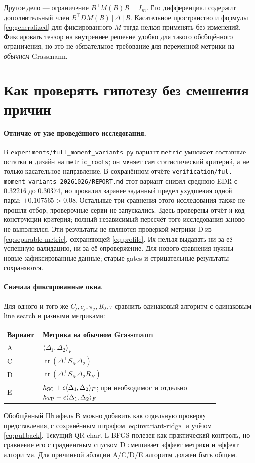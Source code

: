\documentclass[11pt,a4paper]{article}
\newcommand{\tr}{\operatorname{tr}}
\newcommand{\inner}[2]{\langle#1,#2\rangle_F}
\newcommand{\code}[1]{\nolinkurl{#1}}
\theoremstyle{remark}
\begin{document}
Другое дело --- ограничение $B^\top M(B)B=I_m$. Его дифференциал содержит
дополнительный член $B^\top DM(B)[\Delta]B$. Касательное пространство
и формулы \eqref{eq:generalized} для фиксированного $M$ тогда нельзя
применять без изменений. Фиксировать тензор на внутреннее решение удобно
для такого обобщённого ограничения, но это не обязательное требование
для переменной метрики на \emph{обычном} Grassmann.

\section{Как проверять гипотезу без смешения причин}

\paragraph{Отличие от уже проведённого исследования.}
В \code{experiments/full_moment_variants.py} вариант \code{metric}
умножает составные остатки и дизайн на \code{metric_roots}; он меняет
сам статистический критерий, а не только касательное направление.
В сохранённом отчёте
\code{verification/full-moment-variants-20261026/REPORT.md}
этот вариант снизил среднюю EDR с $0.32216$ до $0.30374$, но провалил
заранее заданный предел ухудшения одной пары: $+0.107565>0.08$.
Остальные три сравнения этого исследования также не прошли отбор,
проверочные серии не запускались. Здесь проверены отчёт и код
конструкции критерия; полный независимый пересчёт того исследования
заново не выполнялся. Эти результаты не являются проверкой метрики D
из \eqref{eq:separable-metric}, сохраняющей \eqref{eq:profile}.
Их нельзя выдавать ни за её успешную валидацию, ни за её опровержение.
Для нового сравнения нужны новые зафиксированные данные; старые gates
и отрицательные результаты сохраняются.

\paragraph{Сначала фиксированные окна.}
Для одного и того же $C_j,c_j,\pi_j,B_0,\tau$ сравнить одинаковый
алгоритм с одинаковым line search и разными метриками:
\begin{center}\small
\begin{tabular}{p{0.10\linewidth}p{0.76\linewidth}}
\toprule
Вариант & Метрика на обычном Grassmann\\\midrule
A & $\inner{\Delta_1}{\Delta_2}$\\
C & $\tr(\Delta_1^\top S_M\Delta_2)$\\
D & $\tr(\Delta_1^\top S_M\Delta_2R_B)$\\
E & $h_{\rm SC}+\epsilon\inner{\Delta_1}{\Delta_2}$;
    при необходимости отдельно $h_{\rm VP}+\epsilon\inner{\Delta_1}{\Delta_2}$\\
\bottomrule
\end{tabular}
\end{center}
Обобщённый Штифель B можно добавить как отдельную проверку представления,
с сохранённым штрафом \eqref{eq:invariant-ridge} и учётом
\eqref{eq:pullback}. Текущий QR-chart L-BFGS полезен как практический
контроль, но сравнение его с градиентным спуском D смешивает эффект
метрики и эффект алгоритма. Для причинной абляции A/C/D/E алгоритм
должен быть общим.
\end{document}

